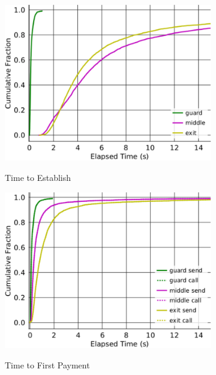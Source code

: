 \begin{figure} \centering
	\begin{subfigure}[t]{0.32\textwidth} \centering
\includegraphics[trim={0 3cm 0 3cm}, clip, width=1.0\textwidth]{images/payment_establish.pdf}
		\label{fig:stats_a}
		\caption{Time to Establish}
	\end{subfigure}
	\begin{subfigure}[t]{0.32\textwidth} \centering
\includegraphics[trim={0 3cm 0 3cm}, clip, width=1.0\textwidth]{images/payment_pay.pdf}
		\label{fig:stats_b}
		\caption{Time to First Payment}
	\end{subfigure}
	\begin{subfigure}[t]{0.32\textwidth} \centering

\end{subfigure}
\end{figure}
